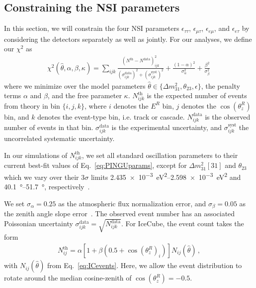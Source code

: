 \documentclass{article}
\newcommand{\zreco}{\ensuremath{\cos{(\theta_z^{R})}}}
\newcommand{\emt}{\ensuremath{\epsilon_{\mu\tau}}}
\newcommand{\eet}{\epsilon_{e\tau}}
\newcommand{\eem}{\epsilon_{e\mu}}
\newcommand{\ett}{\ensuremath{\epsilon_{\tau\tau}}}
\newcommand{\Ereco}{E^{R}}
\newcommand{\dm}{\Delta m^2_{31}}
\begin{document}
\subsection{Constraining the NSI parameters}\label{sec:constraining} %
In this section, we will constrain the four NSI parameters $\ett$, $\emt$, $\eem$, and $\eet$ by considering the detectors separately as well as jointly.
For our analyses, we define our $\chi^2$ as
\begin{align}\label{eq:chisq}
    \chi^{2}(\hat{\theta},\alpha,\beta, \kappa)=\sum_{ijk} \frac{\left(N^\text{th}-N^\text{data}\right)_{ijk}^{2}}
    {\left(\sigma^\text{data}_{ijk}\right)^{2} + \left(\sigma^\text{syst}_{ijk}\right)^{2}}+ 
    \frac{(1-\alpha)^2}{\sigma_\alpha^2} + \frac{\beta^2}{\sigma_\beta^2}\,
\end{align}
where we minimize over the model parameters $\hat{\theta} \in \{\dm, \theta_{23}, \epsilon\}$, the penalty terms $\alpha$ and $\beta$, and the free parameter $\kappa$.
$N_{ijk}^\text{th}$ is the expected number of events from theory in bin $\{i,j,k\}$, where $i$ denotes the $\Ereco$ bin, $j$ denotes the $\zreco$ bin,
and $k$ denotes the event-type bin, i.e. track or cascade. 
$N_{ijk}^\text{data}$ is the observed number of events in that bin. $\sigma^\text{data}_{ijk}$ is the experimental uncertainty, and $\sigma^\text{syst}_{ijk}$ the uncorrelated systematic
uncertainty.

In our simulations of $N_{ijk}^\text{th}$, we set all standard oscillation parameters to their current best-fit values of Eq.~\ref{eq:PINGUparams}, 
except for $\dm[31]$ and $\theta_{23}$
which we vary over their $3\sigma$ limits \SIrange{2.435e-3}{2.598e-3}{\eV\squared} and \SIrange{40.1}{51.7}{\degree}, respectively~\cite{nufit}.

We set $\sigma_\alpha = 0.25$ as the atmospheric flux normalization error, and $\sigma_\beta = 0.05$ as the zenith angle slope error~\cite{hondapaper}. 
The observed event number has an associated Poissonian uncertainty $\sigma_{ijk}^\text{data} = \sqrt{N_{ijk}^\text{data}}$.
For IceCube, the event count takes the form
\begin{align}
    N^\text{th}_{ij} = \alpha\left[1+\beta (0.5 + \zreco_i )\right] N_{ij}(\hat{\theta})\,,
\end{align}
with $N_{ij}(\hat{\theta})$ from Eq.~\ref{eq:ICevents}. Here, we allow the event distribution to rotate around the median cosine-zenith of $\zreco = -0.5$.
\end{document}

